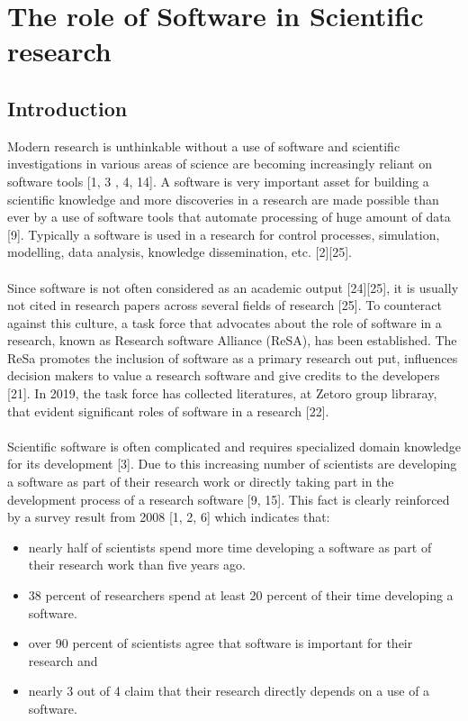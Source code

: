 \chapter{The role of Software in Scientific research}


\section{Introduction }
Modern research is unthinkable without a use of software and scientific investigations in various areas of science are becoming increasingly reliant on software tools [1, 3 , 4, 14]. 
A software is very important asset for building a scientific knowledge and more discoveries in a research are made possible than ever by a use of software tools that automate processing of huge amount of data [9]. Typically a software is used in a research for control processes, simulation, modelling, data analysis, knowledge dissemination, etc. [2][25]. \\\\
Since software is not often considered as an academic output [24][25], it is usually not cited in research papers across several fields of research [25]. To counteract against this culture, a task force that advocates about the role of software in a research, known as Research software Alliance (ReSA), has been established. The ReSa promotes the inclusion of software as a primary research out put, influences decision makers to value a research software and give credits to the developers [21]. In 2019, the task force has collected literatures, at Zetoro group libraray, that evident significant roles of software in a research [22]. \\\\
Scientific software is often complicated and requires specialized domain knowledge for its development [3]. Due to this increasing number of scientists are developing a software as part of their research work or directly taking part in the development process of a research software [9, 15]. This fact is clearly reinforced by a  survey result from 2008 [1, 2, 6] which indicates that:

\vspace{-5mm}   %
\begin{itemize}[noitemsep,topsep=0pt]
    \item nearly half of scientists spend more time developing a software as part of their research work than five years ago.
    \item 38 percent of researchers spend at least 20 percent of their time developing a software.
    \item over 90 percent of scientists agree that software is important for their research and
    \item nearly 3 out of 4 claim that their research directly depends on a use of a software.  
\end{itemize}

